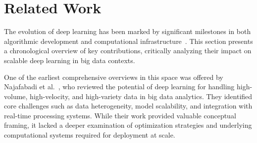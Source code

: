 \documentclass[acmsmall]{acmart}
\begin{document}





\section{Related Work}
\label{sec:related-work}

The evolution of deep learning has been marked by significant milestones in both algorithmic development and computational infrastructure~\citet{thompson2020computational,mayer2020scalable,capra2020hardware}. 
This section presents a chronological overview of key contributions, critically analyzing their impact on scalable deep learning in big data contexts.

One of the earliest comprehensive overviews in this space was offered by Najafabadi et al.~\cite{najafabadi2015deep}, who reviewed the potential of deep learning for handling high-volume, high-velocity, and high-variety data in big data analytics. They identified core challenges such as data heterogeneity, model scalability, and integration with real-time processing systems. While their work provided valuable conceptual framing, it lacked a deeper examination of optimization strategies and underlying computational systems required for deployment at scale.
\end{document}
